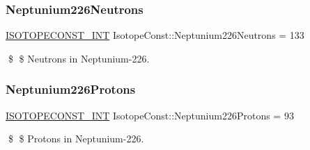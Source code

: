 \subsubsection{\texorpdfstring{Neptunium226\+Neutrons}{Neptunium226Neutrons}}
{\footnotesize\ttfamily \mbox{\hyperlink{group___isotope_const-_macros_ga5f18360b3e99483a35c32d789e62621c}{I\+S\+O\+T\+O\+P\+E\+C\+O\+N\+S\+T\+\_\+\+I\+NT}} Isotope\+Const\+::\+Neptunium226\+Neutrons = 133}

\$ \$ Neutrons in Neptunium-\/226. \mbox{\label{group___isotope_const-_neptunium-_np226_gad75fef18d846be9319823bb62a3d40b2}} 
\subsubsection{\texorpdfstring{Neptunium226\+Protons}{Neptunium226Protons}}
{\footnotesize\ttfamily \mbox{\hyperlink{group___isotope_const-_macros_ga5f18360b3e99483a35c32d789e62621c}{I\+S\+O\+T\+O\+P\+E\+C\+O\+N\+S\+T\+\_\+\+I\+NT}} Isotope\+Const\+::\+Neptunium226\+Protons = 93}

\$ \$ Protons in Neptunium-\/226. 